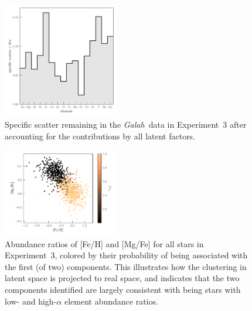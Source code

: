 \documentclass[twocolumn]{aastex62}
\newcommand{\project}[1]{\textsl{#1}}
\newcommand{\Galah}{\project{Galah}}
\begin{document}
\begin{figure}
	\includegraphics[width=0.45\textwidth]{experiments/exp9-log-xfe-offset-specific-scatter.pdf}
	\caption{Specific scatter remaining in the \Galah\ data \citep{Buder:2018}
			 in Experiment~3 after accounting for the contributions by all
			 latent factors.}
    \label{fig:exp9-specific-scatter}
\end{figure}



\begin{figure}
	\includegraphics[width=0.45\textwidth]{experiments/exp9-log-xfe-offset-cluster.pdf}
	\caption{Abundance ratios of [Fe/H] and [Mg/Fe] for all stars in Experiment~3,
			 colored by their probability of being associated with the first (of two)
			 components. This illustrates how the clustering in latent space is projected
			 to real space, and indicates that the two components identified are largely
			 consistent with being stars with low- and high-$\alpha$ element abundance
			 ratios.}
    \label{fig:exp9-cluster}
\end{figure}
\end{document}
